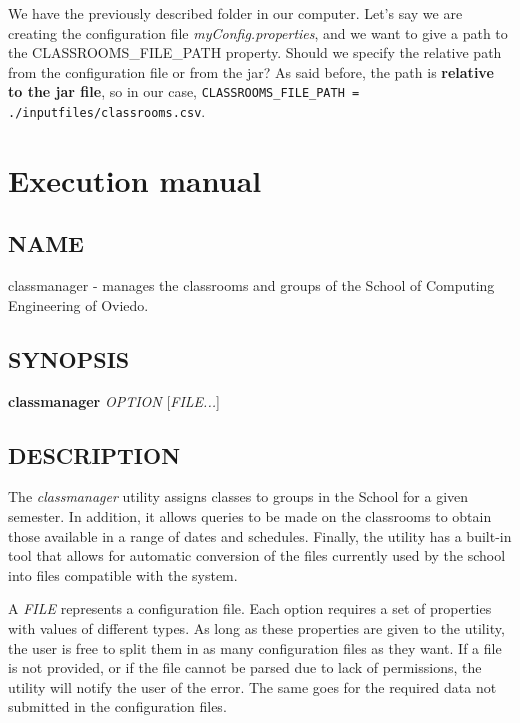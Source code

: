 We have the previously described folder in our computer. Let's say we are creating the configuration file \textit{myConfig.properties}, and we want to give a path to the CLASSROOMS\_FILE\_PATH property. Should we specify the relative path from the configuration file or from the jar? As said before, the path is \textbf{relative to the jar file}, so in our case, \verb|CLASSROOMS_FILE_PATH = ./inputfiles/classrooms.csv|.



\section{Execution manual}


\subsection*{NAME}

\begin{description}
    \item classmanager - manages the classrooms and groups of the School of Computing Engineering of Oviedo.
\end{description}


\subsection*{SYNOPSIS}

\begin{description}
    \item \textbf{classmanager} \textit{OPTION} [\textit{FILE...}]
\end{description}


\subsection*{DESCRIPTION}

The \textit{classmanager} utility assigns classes to groups in the School for a given semester. In addition, it allows queries to be made on the classrooms to obtain those available in a range of dates and schedules. Finally, the utility has a built-in tool that allows for automatic conversion of the files currently used by the school into files compatible with the system. 

A \textit{FILE} represents a configuration file. Each option requires a set of properties with values of different types. As long as these properties are given to the utility, the user is free to split them in as many configuration files as they want. If a file is not provided, or if the file cannot be parsed due to lack of permissions, the utility will notify the user of the error. The same goes for the required data not submitted in the configuration files. 


